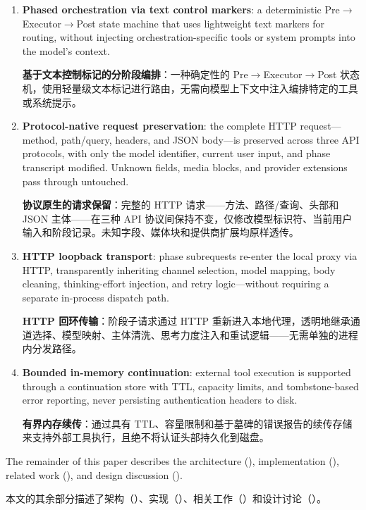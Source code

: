 \begin{enumerate}
    \item \textbf{Phased orchestration via text control markers}: a deterministic Pre$\rightarrow$Executor$\rightarrow$Post state machine that uses lightweight text markers for routing, without injecting orchestration-specific tools or system prompts into the model's context.
    \begin{chinese}
    \textbf{基于文本控制标记的分阶段编排}：一种确定性的 Pre$\rightarrow$Executor$\rightarrow$Post 状态机，使用轻量级文本标记进行路由，无需向模型上下文中注入编排特定的工具或系统提示。
    \end{chinese}
    \item \textbf{Protocol-native request preservation}: the complete HTTP request---method, path/query, headers, and JSON body---is preserved across three API protocols, with only the model identifier, current user input, and phase transcript modified. Unknown fields, media blocks, and provider extensions pass through untouched.
    \begin{chinese}
    \textbf{协议原生的请求保留}：完整的 HTTP 请求——方法、路径/查询、头部和 JSON 主体——在三种 API 协议间保持不变，仅修改模型标识符、当前用户输入和阶段记录。未知字段、媒体块和提供商扩展均原样透传。
    \end{chinese}
    \item \textbf{HTTP loopback transport}: phase subrequests re-enter the local proxy via HTTP, transparently inheriting channel selection, model mapping, body cleaning, thinking-effort injection, and retry logic---without requiring a separate in-process dispatch path.
    \begin{chinese}
    \textbf{HTTP 回环传输}：阶段子请求通过 HTTP 重新进入本地代理，透明地继承通道选择、模型映射、主体清洗、思考力度注入和重试逻辑——无需单独的进程内分发路径。
    \end{chinese}
    \item \textbf{Bounded in-memory continuation}: external tool execution is supported through a continuation store with TTL, capacity limits, and tombstone-based error reporting, never persisting authentication headers to disk.
    \begin{chinese}
    \textbf{有界内存续传}：通过具有 TTL、容量限制和基于墓碑的错误报告的续传存储来支持外部工具执行，且绝不将认证头部持久化到磁盘。
    \end{chinese}
\end{enumerate}

The remainder of this paper describes the architecture (), implementation (), related work (), and design discussion ().
\begin{chinese}
本文的其余部分描述了架构（）、实现（）、相关工作（）和设计讨论（）。
\end{chinese}
